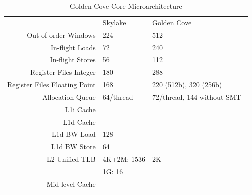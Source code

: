 \begin{table}[t]
	\centering
	\caption{\label{tab:micro-arch-params}Golden Cove Core Microarchitecture}
	\begin{tabular}{r|ll}
		\toprule
			&	Skylake & Golden Cove \\
		\rowcolor[HTML]{EFEFEF}Out-of-order Windows		& 224~\cite{Intel_2020_Skylake_SP} & 512~\cite{ServerTheHome_2023_SPR_Press,Wccftech_2023_SPR_Press} \\
		In-flight Loads & 72~\cite{Intel_2020_Skylake_SP} & 240~\cite{ServerTheHome_2023_SPR_Press,Wccftech_2023_SPR_Press} \\
		\rowcolor[HTML]{EFEFEF}In-flight Stores & 56~\cite{Intel_2020_Skylake_SP} & 112~\cite{ServerTheHome_2023_SPR_Press,Wccftech_2023_SPR_Press} \\
		Register Files Integer & 180~\cite{Intel_2020_Skylake_SP} & 288~\cite{ServerTheHome_2023_SPR_Press,Wccftech_2023_SPR_Press} \\
		\rowcolor[HTML]{EFEFEF}Register Files Floating Point & 168~\cite{Intel_2020_Skylake_SP} & 220 (512b), 320 (256b)~\cite{ServerTheHome_2023_SPR_Press,Wccftech_2023_SPR_Press} \\
		Allocation Queue & 64/thread~\cite{Intel_2020_Skylake_SP} & 72/thread, 144 without SMT~\cite{ServerTheHome_2023_SPR_Press,Wccftech_2023_SPR_Press} \\
		\rowcolor[HTML]{EFEFEF}L1i Cache & & \\
		L1d Cache & & \\
		\rowcolor[HTML]{EFEFEF}L1d BW Load & 128~\cite{Intel_2020_Skylake_SP} & \\
		L1d BW Store & 64~\cite{Intel_2020_Skylake_SP} & \\
		\rowcolor[HTML]{EFEFEF}L2 Unified TLB & 4K+2M: 1536 & 2K~\cite{ServerTheHome_2023_SPR_Press,Wccftech_2023_SPR_Press} \\
		\rowcolor[HTML]{EFEFEF}  & 1G: 16~\cite{Intel_2020_Skylake_SP} & \\
		Mid-level Cache & & \\
		\bottomrule
	\end{tabular}
\end{table}


